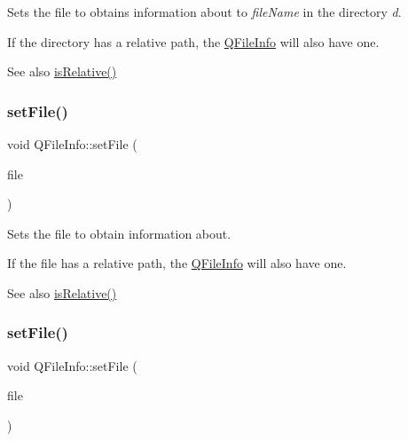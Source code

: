 Sets the file to obtains information about to {\itshape file\+Name} in the directory {\itshape d}.

If the directory has a relative path, the \mbox{\hyperlink{class_q_file_info}{Q\+File\+Info}} will also have one.

\begin{DoxySeeAlso}{See also}
\mbox{\hyperlink{class_q_file_info_ae1b2d0ad6ca05510092d0182e276a5d0}{is\+Relative()}} 
\end{DoxySeeAlso}
\mbox{\label{class_q_file_info_a9a90b344f26a58641fa784efbaa3ce6e}} 
\subsubsection{\texorpdfstring{setFile()}{setFile()}\hspace{0.1cm}{\footnotesize\ttfamily [2/3]}}
{\footnotesize\ttfamily void Q\+File\+Info\+::set\+File (\begin{DoxyParamCaption}\item[{const \mbox{\hyperlink{class_q_file}{Q\+File}} \&}]{file }\end{DoxyParamCaption})}

Sets the file to obtain information about.

If the file has a relative path, the \mbox{\hyperlink{class_q_file_info}{Q\+File\+Info}} will also have one.

\begin{DoxySeeAlso}{See also}
\mbox{\hyperlink{class_q_file_info_ae1b2d0ad6ca05510092d0182e276a5d0}{is\+Relative()}} 
\end{DoxySeeAlso}
\mbox{\label{class_q_file_info_a6215e0e8c9466ee7db82c13259655b98}} 
\subsubsection{\texorpdfstring{setFile()}{setFile()}\hspace{0.1cm}{\footnotesize\ttfamily [3/3]}}
{\footnotesize\ttfamily void Q\+File\+Info\+::set\+File (\begin{DoxyParamCaption}\item[{const \mbox{\hyperlink{class_q_string}{Q\+String}} \&}]{file }\end{DoxyParamCaption})}

